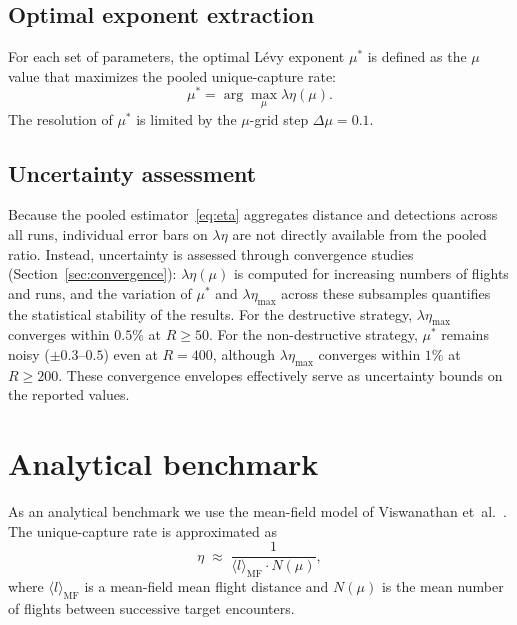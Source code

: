 \subsection{Optimal exponent extraction}

For each set of parameters, the optimal L\'evy exponent
$\mu^*$ is defined as the $\mu$ value that maximizes the
pooled unique-capture rate:
\begin{equation}
  \mu^* = \arg\max_{\mu} \lambda\eta(\mu).
  \label{eq:mu_star}
\end{equation}
The resolution of $\mu^*$ is limited by the $\mu$-grid step
$\Delta\mu = 0.1$.

\subsection{Uncertainty assessment}

Because the pooled estimator~\eqref{eq:eta} aggregates distance
and detections across all runs, individual error bars on
$\lambda\eta$ are not directly available from the pooled ratio.
Instead, uncertainty is assessed through convergence studies
(Section~\ref{sec:convergence}): $\lambda\eta(\mu)$ is computed
for increasing numbers of flights and runs, and the
variation of $\mu^*$ and $\lambda\eta_{\max}$ across these
subsamples quantifies the statistical stability of the results.
For the destructive strategy, $\lambda\eta_{\max}$ converges
within $0.5\%$ at $R \geq 50$.  For the non-destructive
strategy, $\mu^*$ remains noisy ($\pm 0.3$--$0.5$) even at
$R = 400$, although $\lambda\eta_{\max}$ converges within $1\%$
at $R \geq 200$.  These convergence envelopes effectively serve
as uncertainty bounds on the reported values.

\section{Analytical benchmark}
\label{sec:analytical_theory}

As an analytical benchmark we use the mean-field model of
Viswanathan et~al.~\cite{viswanathan1999optimizing}.  The
unique-capture rate is approximated as
\begin{equation}
  \eta \;\approx\; \frac{1}{\langle l \rangle_{\mathrm{MF}}
  \cdot N(\mu)},
  \label{eq:eta_analytical}
\end{equation}
where $\langle l \rangle_{\mathrm{MF}}$ is a mean-field
mean flight distance and $N(\mu)$ is the mean number of
flights between successive target encounters.

